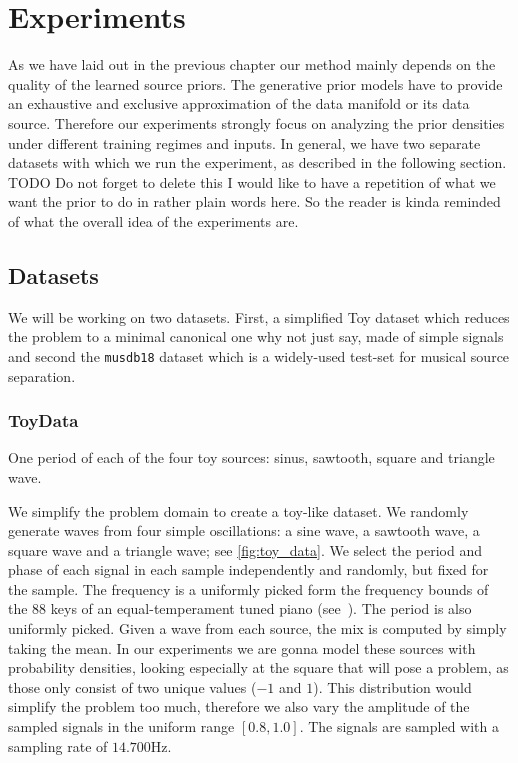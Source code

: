 \chapter{Experiments}%
\label{ch:experiments}
As we have laid out in the previous chapter our method mainly depends on the quality of the learned source priors. The generative prior models have to provide an exhaustive and exclusive approximation of the data manifold or its data source. Therefore our experiments strongly focus on analyzing the prior densities under different training regimes and inputs. In general, we have two separate datasets with which we run the experiment, as described in the following section. TODO {\color{red} Do not forget to delete this}
{\color{red}I would like to have a repetition of what we want the prior to do in rather plain words here. So the reader is kinda reminded of what the overall idea of the experiments are.}


\section{Datasets}
We will be working on two datasets. First, a simplified Toy dataset which reduces the problem to a minimal canonical one {\color{red} why not just say, made of simple signals} and second the \texttt{musdb18} dataset which is a widely-used test-set for musical source separation.

\subsection{ToyData}
\begin{marginfigure}[5em]
    \resizebox{\textwidth}{!}{%
    }%
    \caption{One period of each of the four toy sources: sinus, sawtooth, square and triangle wave.}%
    \label{fig:toy_data}
\end{marginfigure}

We simplify the problem domain to create a toy-like dataset. We randomly generate waves from four simple oscillations: a sine wave, a sawtooth wave, a square wave and a triangle wave; see \cref{fig:toy_data}.  We select the period and phase of each signal in each sample independently and randomly, but fixed for the sample. The frequency is a uniformly picked form the frequency bounds of the 88 keys of an equal-temperament tuned piano (see~). The period is also uniformly picked. Given a wave from each source, the mix is computed by simply taking the mean. In our experiments we are gonna model these sources with probability densities, looking especially at the square that will pose a problem, as those only consist of two unique values (\(-1\) and \(1\)). This distribution would simplify the problem too much, therefore we also vary the amplitude of the sampled signals in the uniform range \([0.8, 1.0]\). The signals are sampled with a sampling rate of \(14.700 \si{\Hz}\).

